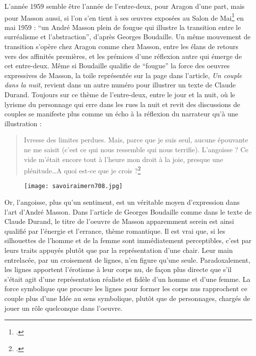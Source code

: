 L’année 1959 semble être l’année de l’entre-deux, pour Aragon d’une part, mais pour Masson aussi, si l’on s’en tient à ses \oe{}uvres exposées au Salon de Mai\footcite{salondemai} en mai 1959 : \enquote{un André Masson plein de fougue qui illustre la transition entre le surréalisme et l’abstraction}, d’après Georges Boudaille. Un même mouvement de transition s’opère chez Aragon comme chez Masson, entre les élans de retours vers des affinités premières, et les prémices d’une réflexion autre qui émerge de cet entre-deux. Même si Boudaille qualifie de \enquote{fougue} la force des oeuvres expressives de Masson, la toile représentée sur la page dans l’article, \emph{Un couple dans la nuit}, revient dans un autre numéro pour illustrer un texte de Claude Durand. Toujours sur ce thème de l’entre-deux, entre le jour et la nuit, où le lyrisme du personnage qui erre dans les rues la nuit et revit des discussions de couples se manifeste plus comme un écho à la réflexion du narrateur qu’à une illustration : 


\begin{quote}
Ivresse des limites perdues. Mais, parce que je suis seul, aucune épouvante ne me saisit (c’est ce qui nous ressemble qui nous terrifie). L’angoisse ? Ce vide m’était encore tout à l’heure mon droit à la joie, presque une plénitude…A quoi est-ce que je crois ?\footcite{durand} 	
\end{quote}

\begin{figure}[H]
   \centering
   \texttt{[image: savoiraimern708.jpg]}
	\caption{\cite{savoiraimer}}\label{fig:Savoiraimer}
\end{figure}

 Or, l’angoisse, plus qu’un sentiment, est un véritable moyen d’expression dans l’art d’André Masson. Dans l’article de Georges Boudaille comme dans le texte de Claude Durand, le titre de l’oeuvre de Masson apparemment serein est ainsi qualifié par l’énergie et l’errance, thème romantique. Il est vrai que, si les silhouettes de l’homme et de la femme sont immédiatement perceptibles, c’est par leurs traits appuyés plutôt que par la représentation d’une chair. Leur main entrelacée, par un croisement de lignes, n’en figure qu’une seule. Paradoxalement, les lignes apportent l’érotisme à leur corps nu, de façon plus directe que s’il s’était agit d’une représentation réaliste et fidèle d’un homme et d’une femme. La force symbolique que procure les lignes pour former les corps nus rapprochent ce couple plus d’une Idée au sens symbolique, plutôt que de personnages, chargés de jouer un rôle quelconque dans l’oeuvre.  



